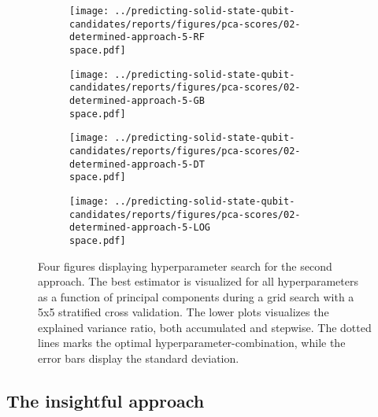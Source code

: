 \begin{figure}[!tbp]
  \begin{subfigure}[b]{0.5\textwidth}
    \texttt{[image: ../predicting-solid-state-qubit-candidates/reports/figures/pca-scores/02-determined-approach-5-RF\\space.pdf]}
    \caption{}
    \label{fig:q2-GB}
  \end{subfigure}%
  \hfill
  \begin{subfigure}[b]{0.5\textwidth}
    \texttt{[image: ../predicting-solid-state-qubit-candidates/reports/figures/pca-scores/02-determined-approach-5-GB\\space.pdf]}
    \caption{}
    \label{fig:q2-RF}
  \end{subfigure}

  \begin{subfigure}[b]{0.5\textwidth}
    \texttt{[image: ../predicting-solid-state-qubit-candidates/reports/figures/pca-scores/02-determined-approach-5-DT\\space.pdf]}
    \caption{}
    \label{fig:q2-DT}
  \end{subfigure}%
  \hfill
  \begin{subfigure}[b]{0.5\textwidth}
    \texttt{[image: ../predicting-solid-state-qubit-candidates/reports/figures/pca-scores/02-determined-approach-5-LOG\\space.pdf]}
    \caption{}
    \label{fig:q2-LOG}
  \end{subfigure}
  \vspace*{-95mm}
  \caption{{Four figures displaying hyperparameter search for the second approach. The best estimator is visualized for all hyperparameters as a function of principal components during a grid search with a 5x5 stratified cross validation. The lower plots visualizes the explained variance ratio, both accumulated and stepwise. The dotted lines marks the optimal hyperparameter-combination, while the error bars display the standard deviation. }}
\end{figure}

\clearpage

\subsection{The insightful approach}



